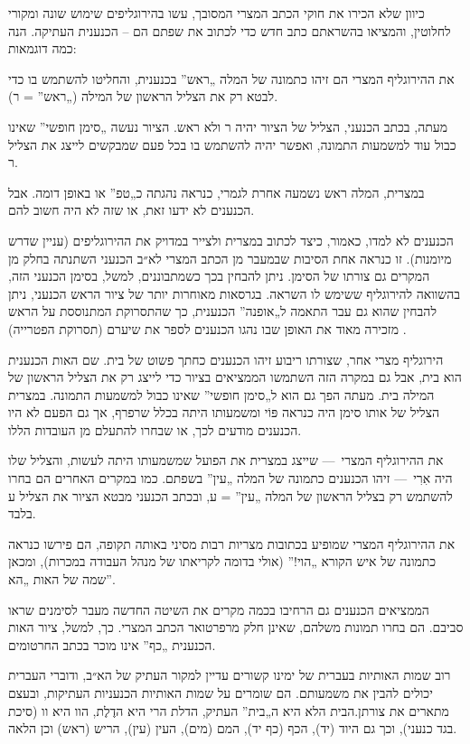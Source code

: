כיוון שלא הכירו את חוקי הכתב המצרי המסובך, עשו בהירוגליפים שימוש שונה ומקורי לחלוטין, והמציאו בהשראתם כתב חדש כדי לכתוב את שפתם הם – הכנענית העתיקה. הנה כמה דוגמאות:

את ההירוגליף המצרי הם זיהו כתמונה של המלה „ראש” בכנענית, והחליטו להשתמש בו כדי לבטא רק את הצליל הראשון של המילה („ראש” = ר).

מעתה, בכתב הכנעני, הצליל של הציור יהיה ר ולא ראש. הציור נעשה „סימן חופשי” שאינו כבול עוד למשמעות התמונה, ואפשר יהיה להשתמש בו בכל פעם שמבקשים לייצג את הצליל ר.

במצרית, המלה ראש נשמעה אחרת לגמרי, כנראה נהגתה כ„טפ” או באופן דומה. אבל הכנענים לא ידעו זאת, או שזה לא היה חשוב להם.

הכנענים לא למדו, כאמור, כיצד לכתוב במצרית ולצייר במדויק את ההירוגליפים (עניין שדרש מיומנות). זו כנראה אחת הסיבות שבמעבר מן הכתב המצרי לא״ב הכנעני השתנתה בחלק מן המקרים גם צורתו של הסימן. ניתן להבחין בכך כשמתבוננים, למשל, בסימן הכנעני הזה, בהשוואה להירוגליף ששימש לו השראה. בגרסאות מאוחרות יותר של ציור הראש הכנעני, ניתן להבחין שהוא גם עבר התאמה ל„אופנה” הכנענית, כך שהתסרוקת המתנוססת על הראש מזכירה מאוד את האופן שבו נהגו הכנענים לספר את שיערם (תסרוקת הפטרייה) .

הירוגליף מצרי אחר, שצורתו ריבוע זיהו הכנענים כחתך פשוט של בית. שם האות הכנענית הוא בית, אבל גם במקרה הזה השתמשו הממציאים בציור כדי לייצג רק את הצליל הראשון של המילה בית. מעתה הפך גם הוא ל„סימן חופשי” שאינו כבול למשמעות התמונה. במצרית הצליל של אותו סימן היה כנראה פּוֹי ומשמעותו היתה בכלל שרפרף, אך גם הפעם לא היו הכנענים מודעים לכך, או שבחרו להתעלם מן העובדות הללו.

את ההירוגליף המצרי~— שייצג במצרית את הפועל שמשמעותו היתה לעשות, והצליל שלו היה אִרִי~— זיהו הכנענים כתמונה של המלה „עין” בשפתם. כמו במקרים האחרים הם בחרו להשתמש רק בצליל הראשון של המלה „עין” = ע, ובכתב הכנעני מבטא הציור את הצליל ע בלבד.

את ההירוגליף המצרי שמופיע בכתובות מצריות רבות מסיני באותה תקופה, הם פירשו כנראה כתמונה של איש הקורא „הוי!” (אולי בדומה לקריאתו של מנהל העבודה במכרות), ומכאן שמה של האות „הא”.

הממציאים הכנענים גם הרחיבו בכמה מקרים את השיטה החדשה מעבר לסימנים שראו סביבם. הם בחרו תמונות משלהם, שאינן חלק מרפרטואר הכתב המצרי. כך, למשל, ציור האות הכנענית „כף” אינו מוכר בכתב החרטומים.

רוב שמות האותיות בעברית של ימינו קשורים עדיין למקור העתיק של הא״ב, ודוברי העברית יכולים להבין את משמעותם. הם שומרים על שמות האותיות הכנעניות העתיקות, ובעצם מתארים את צורתן.הבית הלא היא ה„בית” העתיק, הדלת הרי היא הדֶלֶת, הוו היא וו (סיכת בגד כנעני), וכך גם היוד (יד), הכף (כף יד), המם (מים), העין (עין), הריש (ראש) וכן הלאה.

